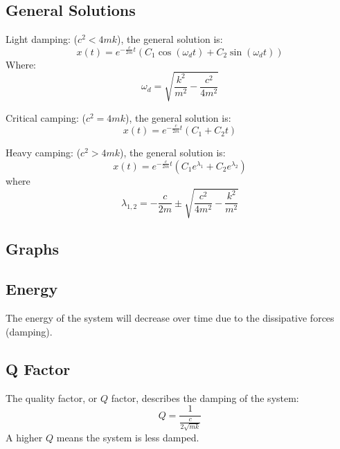 \documentclass[12pt,a4paper]{article}
\begin{document}
	\subsection*{General Solutions}
	\indent Light damping: (\( c^2 < 4mk \)), the general solution is:\\
	\[
	x(t) = e^{-\frac{c}{2m}t} \left( C_1 \cos(\omega_d t) + C_2 \sin(\omega_d t) \right)
	\]
	Where:
	\[
	\omega_d = \sqrt{\frac{k^2}{m^2} - \frac{c^2}{4m^2}}
	\]
	
	Critical camping: (\( c^2 = 4mk \)), the general solution is:\\
	\[
	x(t) = e^{-\frac{c}{2m}t} \left( C_1 + C_2 t \right)
	\]
	
	Heavy camping: (\( c^2 > 4mk \)), the general solution is:\\
	\[
	x(t) = e^{-\frac{c}{2m}t} \left( C_1 e^{\lambda_1} + C_2 e^{\lambda_2} \right)
	\]
	where \[ \lambda_{1,2} = -\frac{c}{2m} \pm \sqrt{\frac{c^2}{4m^2} - \frac{k^2}{m^2}} \]
	\subsection*{Graphs}
	
	\subsection*{Energy}
	The energy of the system will decrease over time due to the dissipative forces (damping).
	
	\subsection*{Q Factor}
	The quality factor, or \( Q \) factor, describes the damping of the system:
	\[
	Q = \frac{1}{\frac{c}{2\sqrt{mk}}}
	\]
	A higher \( Q \) means the system is less damped.
	
\end{document}
